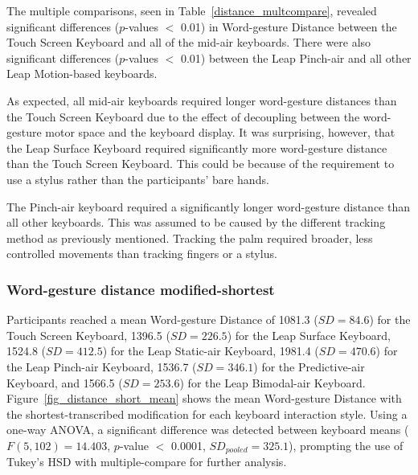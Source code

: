 The multiple comparisons, seen in Table~\ref{distance_multcompare}, revealed significant differences ($p$-values $<$ 0.01) in Word-gesture Distance between the Touch Screen Keyboard and all of the mid-air keyboards. There were also significant differences ($p$-values $<$ 0.01) between the Leap Pinch-air and all other Leap Motion-based keyboards.

As expected, all mid-air keyboards required longer word-gesture distances than the Touch Screen Keyboard due to the effect of decoupling between the word-gesture motor space and the keyboard display. It was surprising, however, that the Leap Surface Keyboard required significantly more word-gesture distance than the Touch Screen Keyboard. This could be because of the requirement to use a stylus rather than the participants' bare hands.

The Pinch-air keyboard required a significantly longer word-gesture distance than all other keyboards. This was assumed to be caused by the different tracking method as previously mentioned. Tracking the palm required broader, less controlled movements than tracking fingers or a stylus.

\subsubsection{Word-gesture distance modified-shortest}
Participants reached a mean Word-gesture Distance of 1081.3 ($SD = 84.6$) for the Touch Screen Keyboard, 1396.5 ($SD = 226.5$) for the Leap Surface Keyboard, 1524.8 ($SD = 412.5$) for the Leap Static-air Keyboard, 1981.4 ($SD = 470.6$) for the Leap Pinch-air Keyboard, 1536.7 ($SD = 346.1$) for the Predictive-air Keyboard, and 1566.5 ($SD = 253.6$) for the Leap Bimodal-air Keyboard. Figure~\ref{fig_distance_short_mean} shows the mean Word-gesture Distance with the shortest-transcribed modification for each keyboard interaction style. Using a one-way ANOVA, a significant difference was detected between keyboard means ($F(5, 102) = 14.403$, $p$-value $<$ 0.0001, $SD_{pooled} = 325.1$), prompting the use of Tukey's HSD with multiple-compare for further analysis.

